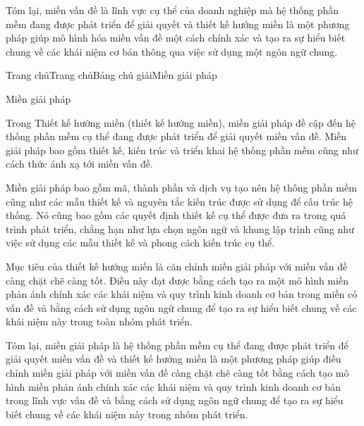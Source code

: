Tóm lại, miền vấn đề là lĩnh vực cụ thể của doanh nghiệp mà hệ thống phần mềm đang được phát triển để giải quyết và thiết kế hướng miền là một phương pháp giúp mô hình hóa miền vấn đề một cách chính xác và tạo ra sự hiểu biết chung về các khái niệm cơ bản thông qua việc sử dụng một ngôn ngữ chung.









Trang chủTrang chủBảng chú giảiMiền giải pháp

Miền giải pháp

Trong Thiết kế hướng miền (thiết kế hướng miền), miền giải pháp đề cập đến hệ thống phần mềm cụ thể đang được phát triển để giải quyết miền vấn đề. Miền giải pháp bao gồm thiết kế, kiến trúc và triển khai hệ thống phần mềm cũng như cách thức ánh xạ tới miền vấn đề.

Miền giải pháp bao gồm mã, thành phần và dịch vụ tạo nên hệ thống phần mềm cũng như các mẫu thiết kế và nguyên tắc kiến trúc được sử dụng để cấu trúc hệ thống. Nó cũng bao gồm các quyết định thiết kế cụ thể được đưa ra trong quá trình phát triển, chẳng hạn như lựa chọn ngôn ngữ và khung lập trình cũng như việc sử dụng các mẫu thiết kế và phong cách kiến trúc cụ thể.

Mục tiêu của thiết kế hướng miền là căn chỉnh miền giải pháp với miền vấn đề càng chặt chẽ càng tốt. Điều này đạt được bằng cách tạo ra một mô hình miền phản ánh chính xác các khái niệm và quy trình kinh doanh cơ bản trong miền có vấn đề và bằng cách sử dụng ngôn ngữ chung để tạo ra sự hiểu biết chung về các khái niệm này trong toàn nhóm phát triển.

Tóm lại, miền giải pháp là hệ thống phần mềm cụ thể đang được phát triển để giải quyết miền vấn đề và thiết kế hướng miền là một phương pháp giúp điều chỉnh miền giải pháp với miền vấn đề càng chặt chẽ càng tốt bằng cách tạo mô hình miền phản ánh chính xác các khái niệm và quy trình kinh doanh cơ bản trong lĩnh vực vấn đề và bằng cách sử dụng ngôn ngữ chung để tạo ra sự hiểu biết chung về các khái niệm này trong nhóm phát triển.

